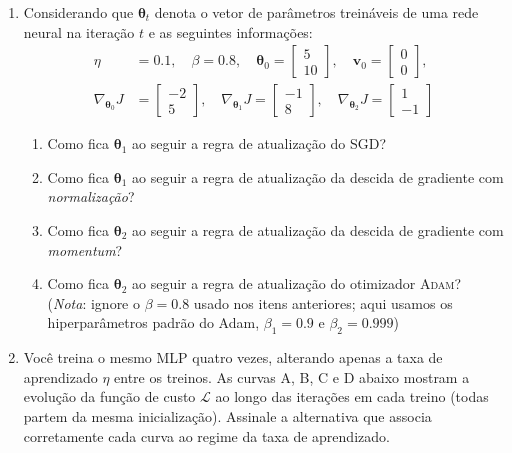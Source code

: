 \documentclass{dlproblemset}
\begin{document}
\begin{enumerate}[1)]
    \item Considerando que $\boldsymbol{\theta}_t$ denota o vetor de parâmetros treináveis de uma rede neural na iteração $t$ e as seguintes informações:
    \begin{align*}
    \eta &= 0.1,\quad \beta=0.8, \quad \boldsymbol{\theta}_{0} =
      \begin{bmatrix}
        5 \\
        10
      \end{bmatrix},
      \quad \mathbf{v}_{0} =
      \begin{bmatrix}
        0 \\
        0
      \end{bmatrix},
    \\
    \nabla_{\boldsymbol{\theta}_{0}} J &=
      \begin{bmatrix}
        -2 \\
        5
      \end{bmatrix},
      \quad
      \nabla_{\boldsymbol{\theta}_{1}} J =
      \begin{bmatrix}
        -1 \\
        8
      \end{bmatrix},
      \quad
      \nabla_{\boldsymbol{\theta}_{2}} J =
      \begin{bmatrix}
        1 \\
        -1
      \end{bmatrix}
    \end{align*}
    \begin{enumerate}
        \item Como fica $\boldsymbol{\theta}_{1}$ ao seguir a regra de atualização do SGD?
        \item Como fica $\boldsymbol{\theta}_{1}$ ao seguir a regra de atualização da descida de gradiente com \textit{normalização}?
        \item Como fica $\boldsymbol{\theta}_{2}$ ao seguir a regra de atualização da descida de gradiente com \textit{momentum}?
        \item {} Como fica $\boldsymbol{\theta}_{2}$ ao seguir a regra de atualização do otimizador \textsc{Adam}? (\textit{Nota}: ignore o $\beta = 0.8$ usado nos itens anteriores; aqui usamos os hiperparâmetros padrão do Adam, $\beta_1 = 0.9$ e $\beta_2 = 0.999$)
    \end{enumerate}

    \item Você treina o mesmo MLP quatro vezes, alterando apenas a taxa de aprendizado $\eta$ entre os treinos. As curvas A, B, C e D abaixo mostram a evolução da função de custo $\mathcal{L}$ ao longo das iterações em cada treino (todas partem da mesma inicialização). Assinale a alternativa que associa corretamente cada curva ao regime da taxa de aprendizado.


\end{enumerate}
\end{document}

